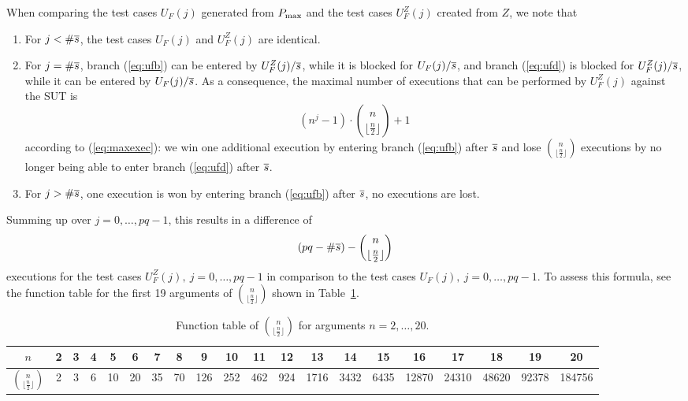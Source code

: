 When comparing the test cases $U_F(j)$ generated from $P_\text{max}$ and the test cases
$U_F^Z(j)$ created from $Z$, we note that
\begin{enumerate}
\item For $j < \#\overline s$, the test cases  $U_F(j)$ and $U_F^Z(j)$ are identical.
\item For $j = \#\overline s$, branch (\ref{eq:ufb}) can be entered by $U_F^Z(j)/\overline s$, while it is blocked for $U_F(j)/\overline s$, and branch (\ref{eq:ufd}) is blocked
for  $U_F^Z(j)/\overline s$, while it can be entered by $U_F(j)/\overline s$. As a consequence,
the maximal number of executions that can be performed by $U_F^Z(j)$ against the SUT 
is 
\begin{equation}
(n^{j} - 1)\cdot \binom{n}{\lfloor\frac{n}{2}\rfloor} + 1
\end{equation}
according to (\ref{eq:maxexec}): we win one additional execution by entering 
branch (\ref{eq:ufb}) after $\overline s$ and lose $\binom{n}{\lfloor\frac{n}{2}\rfloor}$ executions
by no longer being able to enter branch (\ref{eq:ufd}) after $\overline s$.

\item For $j > \#\overline s$, one execution is won by entering 
branch (\ref{eq:ufb}) after $\overline s$, no executions are lost.
\end{enumerate}
%
Summing up over $j = 0,\dots,pq-1$, this results in a difference of 
%
\begin{equation}
(pq  - \#\overline s) - \binom{n}{\lfloor\frac{n}{2}\rfloor}
\end{equation}
executions for the test cases $U_F^Z(j),\ j=0,\dots,pq-1$ in comparison to 
the test cases $U_F(j),\ j=0,\dots,pq-1$. To assess this formula, see the function
table for the first 19  arguments of $\binom{n}{\lfloor\frac{n}{2}\rfloor}$ shown
in Table~\ref{table:binom}.
%
\begin{table}[htp]
\caption{Function table of $\binom{n}{\lfloor\frac{n}{2}\rfloor}$ for arguments
$n = 2,\dots,20$.}
\begin{center}
\begin{tabular}{c||c|c|c|c|c|c|c|c|c|c|c|c|c|c|c|c|c|c|c}
$n$ & 2 & 3 & 4 & 5 & 6 & 7 & 8 & 9 & 10 & 11 & 12 & 13  & 14 & 15 & 16 & 17 & 18 & 19 & 20 \\\hline
$\binom{n}{\lfloor\frac{n}{2}\rfloor}$ &
     2 & 3 & 6& 10 & 20 & 35 & 70 & 126 & 252 &
     462&924&1716&3432&6435&12870&24310&48620&92378&184756
\end{tabular}
\end{center}
\label{table:binom}
\end{table}
